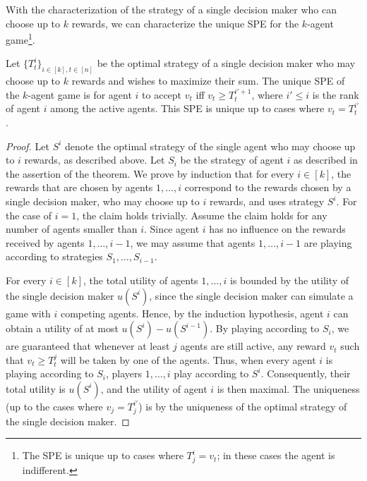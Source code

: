 With the characterization of the strategy of a single decision maker who can choose up to $k$ rewards, we can characterize the unique SPE for the $k$-agent game\footnote{The SPE is unique up to cases where $T_j^i=v_t$; in these cases the agent is indifferent.}.
\begin{theorem}\label{thm:propht many lex is like a single agent}
Let $\{T_t^i\}_{i \in [k],t \in [n]}$ be the optimal strategy of a single decision maker who may choose up to $k$ rewards and wishes to maximize their sum. The unique SPE of the $k$-agent game is for agent $i$ to accept $v_t$ iff $v_t \geq T_t^{i'+1}$, where $i'\leq i$ is the rank of agent $i$ among the active agents. This SPE is unique up to cases where $v_t = T_t^{i'}$.
\end{theorem}
\begin{proof}
	Let $S^i$ denote the optimal strategy of the single agent who may choose up to $i$ rewards, as described above. 
	Let $S_i$ be the strategy of agent $i$ as described in the assertion of the theorem.
	We prove by induction that for every $i \in [k]$, the rewards that are chosen by agents $1,\ldots,i$ correspond to the rewards chosen by a single decision maker, who may choose up to $i$ rewards, and uses strategy $S^i$. 
	For the case of $i=1$, the claim holds trivially. %
	Assume the claim holds for any number of agents smaller than $i$. 
	Since agent $i$ has no influence on the rewards received by agents $1,\ldots,i-1$, we may assume that agents $1,\ldots,i-1$ are playing according to strategies $S_1,\ldots,S_{i-1}$.
	
	For every $i\in [k]$, the total utility of agents $1,\ldots,i$ is bounded by the utility of the single decision maker $u(S^i)$, since the single decision maker can simulate a game with $i$ competing agents. Hence, by the induction hypothesis, agent $i$ can obtain a utility of at most $u(S^i)-u(S^{i-1})$. By playing according to $S_i$, we are guaranteed that whenever at least $j$ agents are still active, any reward $v_t$ such that $v_t \geq T_t^{j}$ will be taken by one of the agents. Thus, when every agent $i$ is playing according to $S_i$, players $1, \ldots, i$ play according to $S^i$. Consequently, their total utility is $u(S^i)$, and the utility of agent $i$ is then maximal. The uniqueness (up to the cases where $v_j = T_j^{i'}$) is by the uniqueness of the optimal strategy of the single decision maker.     
\end{proof}

